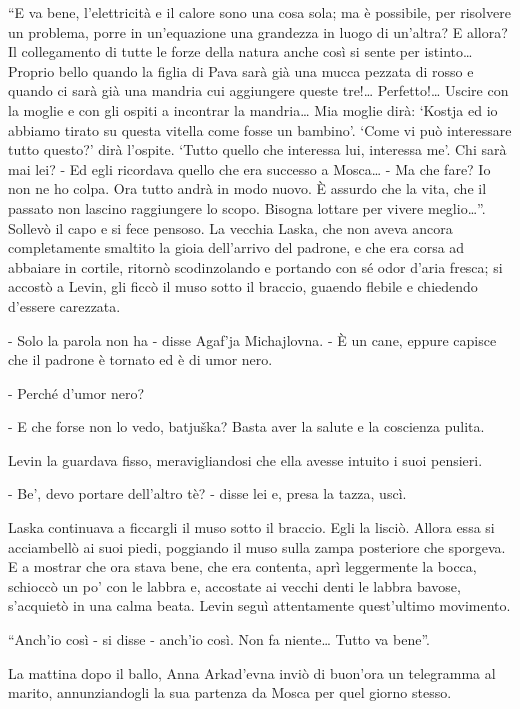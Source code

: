 ``E va bene, l'elettricità e il calore sono una cosa sola; ma è possibile, per risolvere un problema, porre in un'equazione una grandezza in luogo di un'altra? E allora? Il collegamento di tutte le forze della natura anche così si sente per istinto\ldots{} Proprio bello quando la figlia di Pava sarà già una mucca pezzata di rosso e quando ci sarà già una mandria cui aggiungere queste tre!\ldots{} Perfetto!\ldots{} Uscire con la moglie e con gli ospiti a incontrar la mandria\ldots{} Mia moglie dirà: `Kostja ed io abbiamo tirato su questa vitella come fosse un bambino'. `Come vi può interessare tutto questo?' dirà l'ospite. `Tutto quello che interessa lui, interessa me'. Chi sarà mai lei? - Ed egli ricordava quello che era successo a Mosca\ldots{} - Ma che fare? Io non ne ho colpa. Ora tutto andrà in modo nuovo. È assurdo che la vita, che il passato non lascino raggiungere lo scopo. Bisogna lottare per vivere meglio\ldots{}''. Sollevò il capo e si fece pensoso. La vecchia Laska, che non aveva ancora completamente smaltito la gioia dell'arrivo del padrone, e che era corsa ad abbaiare in cortile, ritornò scodinzolando e portando con sé odor d'aria fresca; si accostò a Levin, gli ficcò il muso sotto il braccio, guaendo flebile e chiedendo d'essere carezzata. 

- Solo la parola non ha - disse Agaf'ja Michajlovna. - È un cane, eppure capisce che il padrone è tornato ed è di umor nero. 

- Perché d'umor nero? 

- E che forse non lo vedo, batjuška? Basta aver la salute e la coscienza pulita. 

Levin la guardava fisso, meravigliandosi che ella avesse intuito i suoi pensieri. 

- Be', devo portare dell'altro tè? - disse lei e, presa la tazza, uscì. 

Laska continuava a ficcargli il muso sotto il braccio. Egli la lisciò. Allora essa si acciambellò ai suoi piedi, poggiando il muso sulla zampa posteriore che sporgeva. E a mostrar che ora stava bene, che era contenta, aprì leggermente la bocca, schioccò un po' con le labbra e, accostate ai vecchi denti le labbra bavose, s'acquietò in una calma beata. Levin seguì attentamente quest'ultimo movimento. 

``Anch'io così - si disse - anch'io così. Non fa niente\ldots{} Tutto va bene''. 

La mattina dopo il ballo, Anna Arkad'evna inviò di buon'ora un telegramma al marito, annunziandogli la sua partenza da Mosca per quel giorno stesso. 

